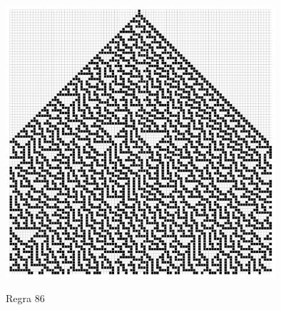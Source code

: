 \documentclass[a4paper, 11pt]{tufte-handout}
\begin{document}
\begin{marginfigure}
  \centering
  \includegraphics[width=0.75\textwidth]{tarefa-1/rule-86-0.png}
  \caption{Regra 86}
  \label{fig:fig_rule86}

\end{marginfigure}
\end{document}
